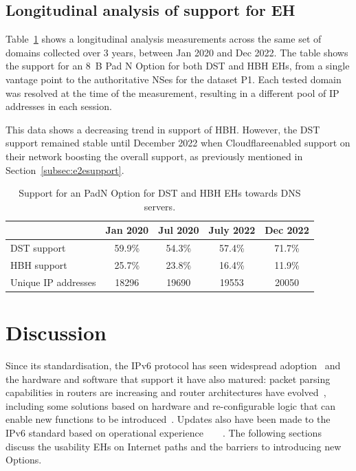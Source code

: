 \documentclass[conference]{IEEEtran}
\begin{document}
\subsection{Longitudinal analysis of support for EH}

Table~\ref{tbl:longitudinal_support} shows a longitudinal analysis measurements
across the same set of domains collected over 3 years,  between Jan 2020 and
Dec 2022.  The table shows the support for an 8~B Pad N Option for both DST and
HBH EHs, from a single vantage point to the authoritative NSes for the dataset P1.
Each tested domain was resolved at the time of the measurement, resulting in a
different pool of IP addresses in each session. 

This data shows a decreasing trend in support of HBH. However, the DST support
remained stable until December 2022 when Cloudflare\texttrademark enabled support on
their network boosting the overall support, as previously
mentioned in Section~\ref{subsec:e2esupport}.

\begin{table}
\caption{Support for an PadN Option for DST and HBH EHs towards DNS servers.}
\begin{tabular}{l|c|c|c|c}
              & Jan 2020 & Jul 2020 & July 2022 & Dec 2022 \\
\hline \hline
DST support   & 59.9\%   & 54.3\%   & 57.4\%    & 71.7\%   \\
HBH support   & 25.7\%   & 23.8\%   & 16.4\%    & 11.9\%   \\
\hline
Unique IP addresses & 18296    & 19690    & 19553     & 20050   
\end{tabular}
\label{tbl:longitudinal_support}
\end{table}


\section{Discussion} 
\label{sec:discussion}

Since its standardisation, the IPv6 protocol has
seen widespread adoption~\cite{v6adoption_ton} and the hardware and software that
support it have also matured: packet parsing capabilities in routers are increasing and
router architectures have evolved~\cite{metamorphosis, hauser2023}, including some solutions based on hardware and re-configurable
logic that can enable new functions to be introduced~\cite{cisco-silicon-one}. Updates also have been made to the IPv6 standard based on operational experience~\cite{RFC5722}~\cite{RFC6946}~\cite{RFC6564}~\cite{RFC8200}.
The following sections discuss the usability EHs on Internet paths and the barriers to introducing new Options.
\end{document}
